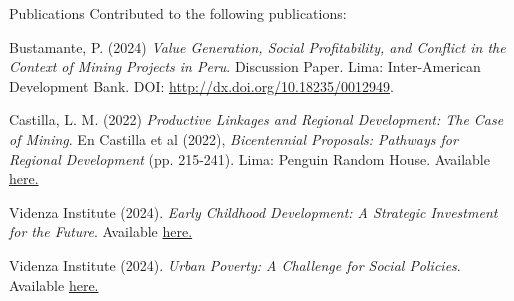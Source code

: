 \documentclass{resume} %
\begin{document}
\begin{rSection}{Publications}
Contributed to the following publications:
\item Bustamante, P. (2024) \emph{Value Generation, Social Profitability, and Conflict in the Context of Mining Projects in Peru}. Discussion Paper. Lima: Inter-American Development Bank. DOI: \href{http://dx.doi.org/10.18235/0012949}{http://dx.doi.org/10.18235/0012949}.
\item Castilla, L. M. (2022) \emph{Productive Linkages and Regional Development: The Case of Mining}.  En Castilla et al (2022), \textit{Bicentennial Proposals: Pathways for Regional Development} (pp. 215-241). Lima: Penguin Random House. Available \href{https://books.google.com/books/about/Propuestas_del_bicentenario.html?id=nfF3EAAAQBAJ}{here.}
\item Videnza Institute (2024). \emph{Early Childhood Development: A Strategic Investment for the Future}. Available \href{https://propuestasdelbicentenario.pe/wp-content/uploads/2024/08/Informe-de-desarrollo-infantil-temprano.pdf}{here.}
\item Videnza Institute (2024). \emph{Urban Poverty: A Challenge for Social Policies}. Available \href{https://propuestasdelbicentenario.pe/wp-content/uploads/2024/08/Pobreza-urbana_un-desafio-para-las-politicas-sociales.pdf}{here.}
\end{rSection}

\end{document}

